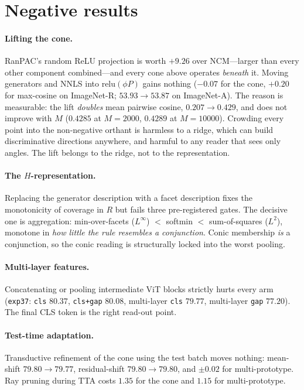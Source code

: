 \documentclass[10pt,twocolumn]{article}
\begin{document}
\section{Negative results}

\paragraph{Lifting the cone.} RanPAC's random ReLU projection is worth $+9.26$
over NCM---larger than every other component combined---and every cone above
operates \emph{beneath} it. Moving generators and NNLS into
$\mathrm{relu}(\phi P)$ gains nothing ($-0.07$ for the cone, $+0.20$ for
max-cosine on ImageNet-R; $53.93\to53.87$ on ImageNet-A). The reason is
measurable: the lift \emph{doubles} mean pairwise cosine, $0.207\to0.429$, and
does not improve with $M$ ($0.4285$ at $M{=}2000$, $0.4289$ at $M{=}10000$).
Crowding every point into the non-negative orthant is harmless to a ridge, which
can build discriminative directions anywhere, and harmful to any reader that
sees only angles. The lift belongs to the ridge, not to the representation.

\paragraph{The $H$-representation.} Replacing the generator description with a
facet description fixes the monotonicity of coverage in $R$ but fails three
pre-registered gates. The decisive one is aggregation: min-over-facets
($L^\infty$) $<$ softmin $<$ sum-of-squares ($L^2$), monotone in \emph{how
little the rule resembles a conjunction}. Conic membership \emph{is} a
conjunction, so the conic reading is structurally locked into the worst pooling.

\paragraph{Multi-layer features.} Concatenating or pooling intermediate ViT
blocks strictly hurts every arm (\texttt{exp37}: \texttt{cls} $80.37$,
\texttt{cls+gap} $80.08$, multi-layer \texttt{cls} $79.77$, multi-layer
\texttt{gap} $77.20$). The final CLS token is the right read-out point.

\paragraph{Test-time adaptation.} Transductive refinement of the cone using the
test batch moves nothing: mean-shift $79.80\to79.77$, residual-shift
$79.80\to79.80$, and $\pm0.02$ for multi-prototype. Ray pruning during TTA costs
$1.35$ for the cone and $1.15$ for multi-prototype.
\end{document}
